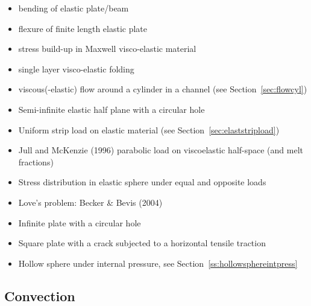\begin{itemize}

\item bending of elastic plate/beam \cite{cehg14,boht08a,vosc15,elga10,demh19,modm02,litu02}

\item flexure of finite length elastic plate \cite{chtl13}

\item stress build-up in Maxwell visco-elastic material 
      \cite{geyu07,chtl13,elga10,demh19}
\item single layer visco-elastic folding \cite{scps01,vosc15}
\item viscous(-elastic) flow around a cylinder in a channel (see Section~\ref{sec:flowcyl})
\item Semi-infinite elastic half plane with a circular hole \cite{verr98}
\item Uniform strip load on elastic material (see Section~\ref{sec:elaststripload})
\item Jull and McKenzie (1996) \cite{jumc96} parabolic load on viscoelastic half-space (and melt fractions) 
\item Stress distribution in elastic sphere under equal and 
      opposite loads \cite{stro52}
\item Love's problem: Becker \& Bevis (2004) \cite{bebe04}
\item Infinite plate with a circular hole \cite{yiha10,rama16}
\item Square plate with a crack subjected to a horizontal tensile 
      traction \cite{litu02}
\item Hollow sphere under internal pressure, see Section~\ref{ss:hollowsphereintpress}
\end{itemize}

\subsection{Convection}

